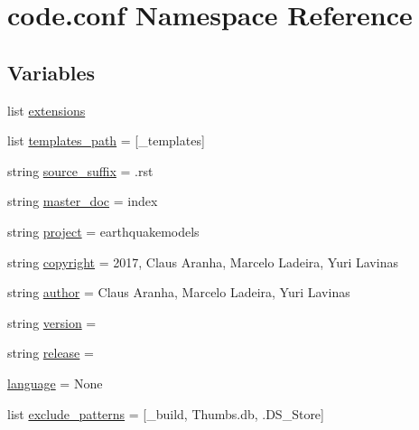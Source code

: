 \hypertarget{namespacecode_1_1conf}{}\section{code.\+conf Namespace Reference}
\label{namespacecode_1_1conf}
\subsection*{Variables}
\begin{DoxyCompactItemize}
\item 
list \hyperlink{namespacecode_1_1conf_a5d4845438e0576cf40e273c949398b6a}{extensions}
\item 
list \hyperlink{namespacecode_1_1conf_adf9ec1a8ebb5b51113bdce170affcb5f}{templates\+\_\+path} = \mbox{[}\textquotesingle{}\+\_\+templates\textquotesingle{}\mbox{]}
\item 
string \hyperlink{namespacecode_1_1conf_a76116ff8eafb430b001d391bb5aabcd3}{source\+\_\+suffix} = \textquotesingle{}.rst\textquotesingle{}
\item 
string \hyperlink{namespacecode_1_1conf_ac5621fb0c9fa22cf292b66d02f227779}{master\+\_\+doc} = \textquotesingle{}index\textquotesingle{}
\item 
string \hyperlink{namespacecode_1_1conf_acc0ab2b4d42948c6aa1ceb6fa10a46ca}{project} = \textquotesingle{}earthquakemodels\textquotesingle{}
\item 
string \hyperlink{namespacecode_1_1conf_a95486e8c49b3f17017a5ba7070f6d2dd}{copyright} = \textquotesingle{}2017, Claus Aranha, Marcelo Ladeira, Yuri Lavinas\textquotesingle{}
\item 
string \hyperlink{namespacecode_1_1conf_ad0acbdb5014c1704f8c4c7bf5b95394d}{author} = \textquotesingle{}Claus Aranha, Marcelo Ladeira, Yuri Lavinas\textquotesingle{}
\item 
string \hyperlink{namespacecode_1_1conf_ab813c501bffcefb3e16cd2d967c7cd0b}{version} = \textquotesingle{}\textquotesingle{}
\item 
string \hyperlink{namespacecode_1_1conf_af30e2633929d9fc903b73063cd5a518f}{release} = \textquotesingle{}\textquotesingle{}
\item 
\hyperlink{namespacecode_1_1conf_ae3fb503f4da7e98046bc54d2bb734d48}{language} = None
\item 
list \hyperlink{namespacecode_1_1conf_abe586505ba27e47e1cc625178fa5c996}{exclude\+\_\+patterns} = \mbox{[}\textquotesingle{}\+\_\+build\textquotesingle{}, \textquotesingle{}Thumbs.\+db\textquotesingle{}, \textquotesingle{}.D\+S\+\_\+\+Store\textquotesingle{}\mbox{]}

\end{DoxyCompactItemize}
